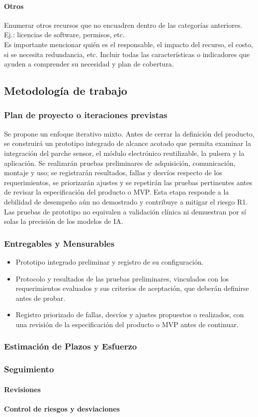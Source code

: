     \paragraph{Otros}
    {\consigna
    Enumerar otros recursos que no encuadren dentro de las categorías anteriores.\\
    Ej.: licencias de software, permisos, etc.\\
    Es importante mencionar quién es el responsable, el impacto del recurso, el costo, si se necesita redundancia, etc. Incluir todas las características o indicadores que ayuden a comprender su necesidad y plan de cobertura.
    }


\subsection{Metodología de trabajo}
\subsubsection{Plan de proyecto o iteraciones previstas}
Se propone un enfoque iterativo mixto. Antes de cerrar la definición del producto, se construirá un prototipo integrado de alcance acotado que permita examinar la integración del parche sensor, el módulo electrónico reutilizable, la pulsera y la aplicación. Se realizarán pruebas preliminares de adquisición, comunicación, montaje y uso; se registrarán resultados, fallas y desvíos respecto de los requerimientos, se priorizarán ajustes y se repetirán las pruebas pertinentes antes de revisar la especificación del producto o MVP. Esta etapa responde a la debilidad de desempeño aún no demostrado y contribuye a mitigar el riesgo R1. Las pruebas de prototipo no equivalen a validación clínica ni demuestran por sí solas la precisión de los modelos de IA.
\subsubsection{Entregables y Mensurables}
\begin{itemize}
    \item Prototipo integrado preliminar y registro de su configuración.
    \item Protocolo y resultados de las pruebas preliminares, vinculados con los requerimientos evaluados y sus criterios de aceptación, que deberán definirse antes de probar.
    \item Registro priorizado de fallas, desvíos y ajustes propuestos o realizados, con una revisión de la especificación del producto o MVP antes de continuar.
\end{itemize}
\subsubsection{Estimación de Plazos y Esfuerzo}
\subsubsection{Seguimiento}
\paragraph{Revisiones}
\paragraph{Control de riesgos y desviaciones}